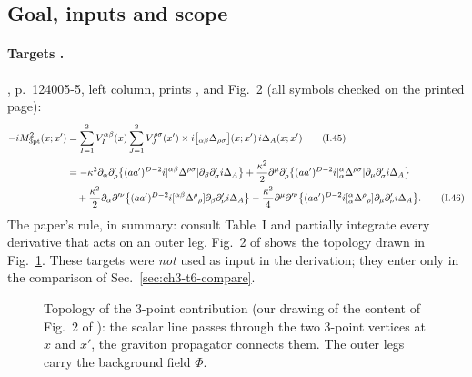 \subsection{Goal, inputs and scope}

\paragraph{Targets \tP.}
\PI, p.~124005-5, left column, prints ,  and Fig.~2 (all symbols checked on the printed page):
\begin{align}
-iM^2_{\rm 3pt}(x;x')&=\sum_{I=1}^2V_I^{\alpha\beta}(x)\sum_{J=1}^2V_J^{\rho\sigma}(x')\times i\big[{}_{\alpha\beta}\Delta_{\rho\sigma}\big](x;x')\,i\Delta_A(x;x')
\tag*{\eqI{45}}\\[3pt]
&=-\kappa^2\partial_\alpha\partial'_\rho\big\{(aa')^{D-2}i[{}^{\alpha\beta}\Delta^{\rho\sigma}]\partial_\beta\partial'_\sigma i\Delta_A\big\}
+\frac{\kappa^2}2\partial^\mu\partial'_\rho\big\{(aa')^{D-2}i[{}^\alpha_\alpha\Delta^{\rho\sigma}]\partial_\mu\partial'_\sigma i\Delta_A\big\}\notag\\
&\quad+\frac{\kappa^2}2\partial_\alpha\partial'^\nu\big\{(aa')^{D-2}i[{}^{\alpha\beta}\Delta^\rho{}_\rho]\partial_\beta\partial'_\nu i\Delta_A\big\}
-\frac{\kappa^2}4\partial^\mu\partial'^\nu\big\{(aa')^{D-2}i[{}^\alpha_\alpha\Delta^\rho{}_\rho]\partial_\mu\partial'_\nu i\Delta_A\big\}.
\tag*{\eqI{46}}
\end{align}
The paper's rule, in summary: consult Table~I and partially integrate every derivative that acts on an outer leg.
Fig.~2 of \PI{} shows the topology drawn in Fig.~\ref{fig:ch3-diagram}.
These targets were \emph{not} used as input in the derivation; they enter only in the comparison of Sec.~\ref{sec:ch3-t6-compare}.

\begin{figure}[h]
\centering
{}
\caption{Topology of the 3-point contribution (our drawing of the content of Fig.~2 of \PI): the scalar line passes through the
two 3-point vertices at $x$ and $x'$, the graviton propagator connects them. The outer legs carry the background field $\Phi$.}
\label{fig:ch3-diagram}
\end{figure}

